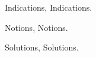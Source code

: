 \bigskip
{}%
\bigskip


%
\bigskip
{}%
\unless\ifLD@Inferno@Master@
	\eject
	\Chapter Indications, Indications.

	\LD@Exo@Indication@Display

	\Chapter Notions, Notions.

	\LD@Exo@Notion@Display

	\Chapter Solutions, Solutions.

	\LD@Exo@Sol@Display
\fi
\bye










